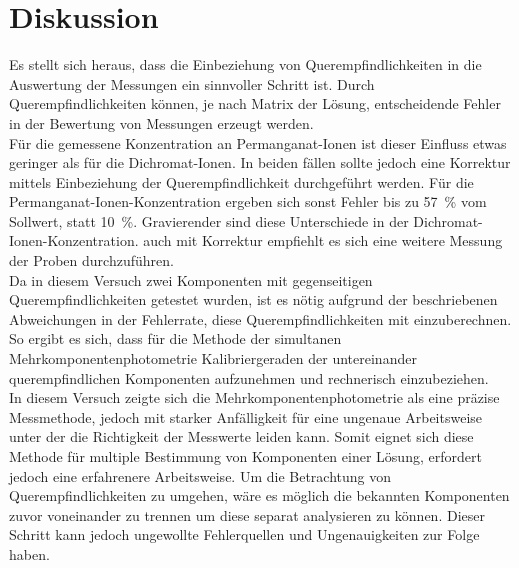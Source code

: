 \section{Diskussion}
\label{sec:diskussion}

Es stellt sich heraus, dass die Einbeziehung von Querempfindlichkeiten in die Auswertung der Messungen ein sinnvoller Schritt ist. Durch Querempfindlichkeiten können, je nach Matrix der Lösung, entscheidende Fehler in der Bewertung von Messungen erzeugt werden.\\
Für die gemessene Konzentration an Permanganat-Ionen ist dieser Einfluss etwas geringer als für die Dichromat-Ionen. In beiden fällen sollte jedoch eine Korrektur mittels Einbeziehung der Querempfindlichkeit durchgeführt werden. Für die Permanganat-Ionen-Konzentration ergeben sich sonst Fehler bis zu \SI{57}{\percent} vom Sollwert, statt \SI{10}{\percent}. Gravierender sind diese Unterschiede in der Dichromat-Ionen-Konzentration. auch mit Korrektur empfiehlt es sich eine weitere Messung der Proben durchzuführen.\\
Da in diesem Versuch zwei Komponenten mit gegenseitigen Querempfindlichkeiten getestet wurden, ist es nötig aufgrund der beschriebenen Abweichungen in der Fehlerrate, diese Querempfindlichkeiten mit einzuberechnen. So ergibt es sich, dass für die Methode der simultanen Mehrkomponentenphotometrie  Kalibriergeraden der untereinander querempfindlichen Komponenten aufzunehmen und rechnerisch einzubeziehen. \\
In diesem Versuch zeigte sich die Mehrkomponentenphotometrie als eine präzise Messmethode, jedoch mit starker Anfälligkeit für eine ungenaue Arbeitsweise unter der die Richtigkeit der Messwerte leiden kann. Somit eignet sich diese Methode für multiple Bestimmung von Komponenten einer Lösung, erfordert jedoch eine erfahrenere Arbeitsweise.\linebreak
Um die Betrachtung von Querempfindlichkeiten zu umgehen, wäre es möglich die bekannten Komponenten zuvor voneinander zu trennen um diese separat analysieren zu können. Dieser Schritt kann jedoch ungewollte Fehlerquellen und Ungenauigkeiten zur Folge haben.